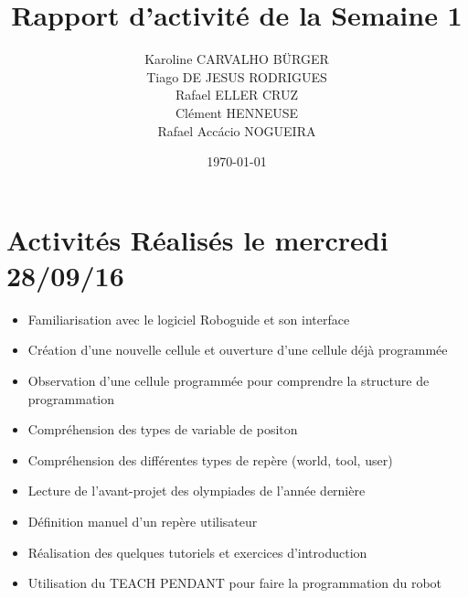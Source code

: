 \documentclass[11pt,a4paper,onecolumn]{articlewithlogo}
\title{Rapport d'activité de la Semaine 1}
\author{Karoline CARVALHO BÜRGER\\ Tiago DE JESUS RODRIGUES\\  Rafael ELLER CRUZ \\ Clément HENNEUSE\\ Rafael Accácio NOGUEIRA }
\date{\today}
\begin{document}
\maketitle
\section{Activités Réalisés le mercredi 28/09/16  }
\begin{itemize}
	\renewcommand\labelitemi{$\circ$}
	\item Familiarisation avec le logiciel Roboguide et son interface
	\item Création d'une nouvelle cellule et ouverture d'une cellule déjà programmée
	\item Observation d'une cellule programmée pour comprendre la structure de programmation 
	\item Compréhension des types de variable de positon
	\item Compréhension des différentes types de repère (world, tool, user)
	\item Lecture de l'avant-projet des  olympiades  de l'année dernière 
	\item Définition manuel d'un repère utilisateur
	\item Réalisation des quelques tutoriels et exercices
	d'introduction
	\item Utilisation du TEACH PENDANT pour faire la programmation du robot
\end{itemize}

%
\end{document}
